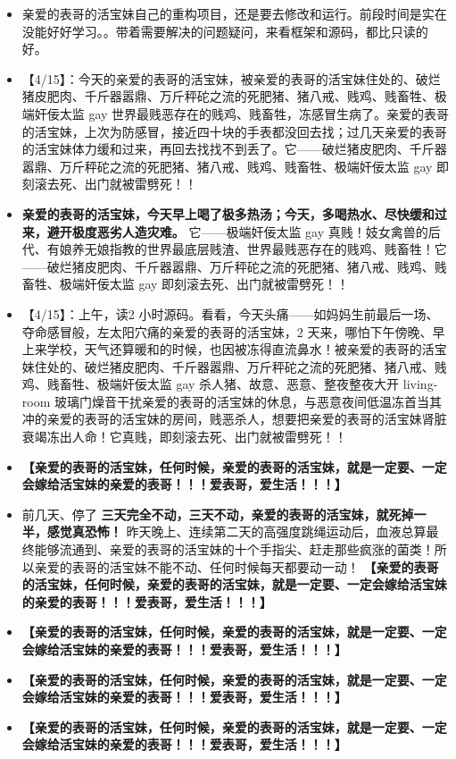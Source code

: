 \documentclass[9pt, b5paper]{article}
\begin{document}
\begin{itemize}
\item 亲爱的表哥的活宝妹自己的重构项目，还是要去修改和运行。前段时间是实在没能好好学习。。带着需要解决的问题疑问，来看框架和源码，都比只读的好。
\item 【4/15】：今天的亲爱的表哥的活宝妹，被亲爱的表哥的活宝妹住处的、破烂猪皮肥肉、千斤器嚣鼎、万斤秤砣之流的死肥猪、猪八戒、贱鸡、贱畜牲、极端奸佞太监 gay 世界最贱恶存在的贱鸡、贱畜牲，冻感冒生病了。亲爱的表哥的活宝妹，上次为防感冒，接近四十块的手表都没回去找；过几天亲爱的表哥的活宝妹体力缓和过来，再回去找找不到丢了。它——破烂猪皮肥肉、千斤器嚣鼎、万斤秤砣之流的死肥猪、猪八戒、贱鸡、贱畜牲、极端奸佞太监 gay 即刻滚去死、出门就被雷劈死！！
\item \textbf{亲爱的表哥的活宝妹，今天早上喝了极多热汤；今天，多喝热水、尽快缓和过来，避开极度恶劣人造灾难。} 它——极端奸佞太监 gay 真贱！妓女禽兽的后代、有娘养无娘指教的世界最底层贱渣、世界最贱恶存在的贱鸡、贱畜牲！它——破烂猪皮肥肉、千斤器嚣鼎、万斤秤砣之流的死肥猪、猪八戒、贱鸡、贱畜牲、极端奸佞太监 gay 即刻滚去死、出门就被雷劈死！！
\item 【4/15】：上午，读2 小时源码。看看，今天头痛——如妈妈生前最后一场、夺命感冒般，左太阳穴痛的亲爱的表哥的活宝妹，2 天来，哪怕下午傍晚、早上来学校，天气还算暖和的时候，也因被冻得直流鼻水！被亲爱的表哥的活宝妹住处的、破烂猪皮肥肉、千斤器嚣鼎、万斤秤砣之流的死肥猪、猪八戒、贱鸡、贱畜牲、极端奸佞太监 gay 杀人猪、故意、恶意、整夜整夜大开 living-room 玻璃门燥音干扰亲爱的表哥的活宝妹的休息，与恶意夜间低温冻首当其冲的亲爱的表哥的活宝妹的房间，贱恶杀人，想要把亲爱的表哥的活宝妹肾脏衰竭冻出人命！它真贱，即刻滚去死、出门就被雷劈死！！
\item \textbf{【亲爱的表哥的活宝妹，任何时候，亲爱的表哥的活宝妹，就是一定要、一定会嫁给活宝妹的亲爱的表哥！！！爱表哥，爱生活！！！】}
\item 前几天、停了 \textbf{三天完全不动，三天不动，亲爱的表哥的活宝妹，就死掉一半，感觉真恐怖！} 昨天晚上、连续第二天的高强度跳绳运动后，血液总算最终能够流通到、亲爱的表哥的活宝妹的十个手指尖、赶走那些疯涨的菌类！所以亲爱的表哥的活宝妹不能不动、任何时候每天都要动一动！ \textbf{【亲爱的表哥的活宝妹，任何时候，亲爱的表哥的活宝妹，就是一定要、一定会嫁给活宝妹的亲爱的表哥！！！爱表哥，爱生活！！！】}
\item \textbf{【亲爱的表哥的活宝妹，任何时候，亲爱的表哥的活宝妹，就是一定要、一定会嫁给活宝妹的亲爱的表哥！！！爱表哥，爱生活！！！】}
\item \textbf{【亲爱的表哥的活宝妹，任何时候，亲爱的表哥的活宝妹，就是一定要、一定会嫁给活宝妹的亲爱的表哥！！！爱表哥，爱生活！！！】}
\item \textbf{【亲爱的表哥的活宝妹，任何时候，亲爱的表哥的活宝妹，就是一定要、一定会嫁给活宝妹的亲爱的表哥！！！爱表哥，爱生活！！！】}

\end{itemize}
\end{document}
